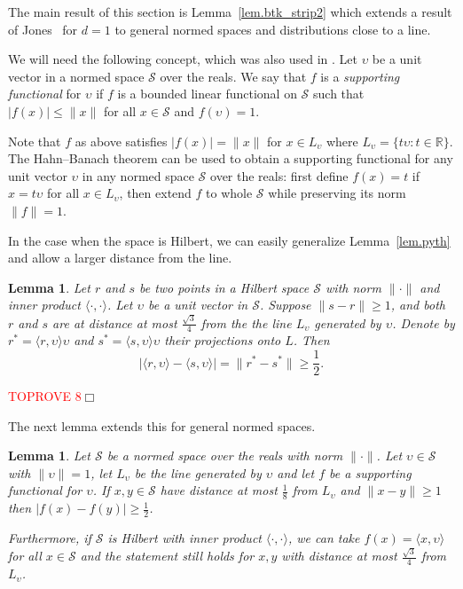 \documentclass{article}
\newenvironment{proof}{\noindent{\bf Proof}}{\hspace*{\fill}$\Box$}
\newtheorem{lemma} [theorem] {Lemma}\newtheorem{attempt} [theorem] {Attempt}\newtheorem{corollary} [theorem] {Corollary}\newtheorem{prop} [theorem] {Proposition}\newtheorem{definition} [theorem] {Definition}\newtheorem{remark} [theorem] {Remark}\newtheorem{conjecture} [theorem] {Conjecture}\newtheorem{claim} [theorem] {Claim}
\begin{document}
The main result of this section is Lemma~\ref{lem.btk_strip2} which extends a result of Jones~\cite{jones}
for $d=1$ to general normed spaces and distributions close to a line.

We will need the following concept, which was also used in \cite{LR}.
Let $\upsilon$ be a unit vector in a normed space $\mathcal{S}$ over the reals.
    We say that $f$ is a \emph{supporting functional} for $\upsilon$ if
    $f$ is a bounded linear functional on $\mathcal{S}$ such
    that $|f(x)| \le \|x\|$ for all $x \in \mathcal{S}$ and
    $f(\upsilon) = 1$.


Note that $f$ as above satisfies $|f(x)|=\|x\|$ for $x \in L_\upsilon$ where $L_\upsilon = \{t \upsilon: t \in \mathbb{R}\}$.
The Hahn--Banach theorem can be used to obtain a supporting functional for any unit vector $\upsilon$ in any normed space $\mathcal{S}$ over the reals: first define $f(x) = t$ if $x = t \upsilon$ for all $x\in L_\upsilon$, then extend $f$ to whole $\mathcal{S}$ while preserving its norm $\|f\|=1$.


In the case when the space is Hilbert, we
can easily generalize Lemma~\ref{lem.pyth} and allow a larger distance from the line. 

\begin{lemma}\label{lem.pyth_gen}
    Let $r$ and $s$ be
two points in a Hilbert space $\mathcal{S}$ with norm $\|\cdot\|$ and inner product $\langle \cdot, \cdot \rangle$.
    Let $\upsilon$ be a unit vector in $\mathcal{S}$.
    Suppose $\|s-r\| \ge 1$, and both $r$ and $s$ are at distance at most $\frac {\sqrt 3} 4$ from the 
    the line $L_\upsilon$ generated by $\upsilon$. Denote by $r^*=\langle r, \upsilon \rangle \upsilon$ and $s^*=\langle s,\upsilon \rangle \upsilon$ their projections
    onto $L$. Then
    \begin{equation*} |\langle r,\upsilon \rangle - \langle s, \upsilon \rangle| = \|r^*-s^*\| \ge
        \frac 1 2.
    \end{equation*}
\end{lemma}
\begin{proof}\textcolor{red}{TOPROVE 8}\end{proof}

\medskip

The next lemma extends this for general normed spaces.

\begin{lemma} \label{lem.supporting_norms}
    Let $\mathcal{S}$ be a normed space over the reals with norm $\|\cdot\|$.
    Let $\upsilon \in \mathcal{S}$ with $\|\upsilon\|=1$, let $L_\upsilon$ be the line generated by $\upsilon$ and let $f$ be 
a
    supporting functional for $\upsilon$. If $x,y \in \mathcal{S}$ have distance at most $\frac 1 8$ from $L_\upsilon$ and $\|x - y\| \ge 1$ then $|f(x) - f(y)| \ge \frac 1 2$.

    Furthermore, if $\mathcal{S}$ is Hilbert with inner product $\langle \cdot, \cdot \rangle$, we can take $f(x) = \langle x, \upsilon \rangle$ for all $x \in \mathcal{S}$ and the statement still holds for $x,y$ with distance at most $\frac {\sqrt 3} 4$ from $L_\upsilon$.
\end{lemma}
\end{document}
